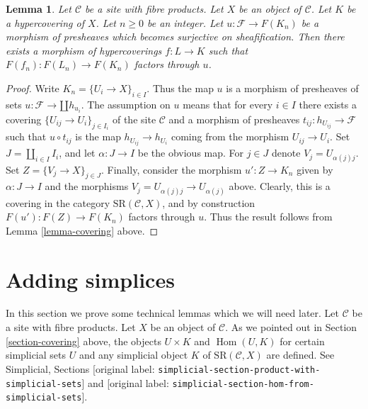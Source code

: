\documentclass[10pt,a4paper]{article}
\theoremstyle{plain}
\newtheorem{lemma}[subsection]{Lemma}
\theoremstyle{definition}
\theoremstyle{remark}
\numberwithin{equation}{subsection}
\def\Hom{\mathop{\mathrm{Hom}}\nolimits}
\begin{document}
\begin{lemma}
\label{lemma-covering-sheaf}
Let $\mathcal{C}$ be a site with fibre products.
Let $X$ be an object of $\mathcal{C}$.
Let $K$ be a hypercovering of $X$.
Let $n \geq 0$ be an integer.
Let $u : \mathcal{F} \to F(K_n)$ be a morphism
of presheaves which becomes surjective
on sheafification.
Then there exists a morphism of hypercoverings
$f: L \to K$ such that $F(f_n) : F(L_n) \to F(K_n)$
factors through $u$.
\end{lemma}

\begin{proof}
Write $K_n = \{U_i \to X\}_{i \in I}$.
Thus the map $u$ is a morphism of presheaves of sets
$u : \mathcal{F} \to \amalg h_{u_i}$.
The assumption on $u$ means that for every
$i \in I$ there exists a covering $\{U_{ij} \to U_i\}_{j \in I_i}$
of the site $\mathcal{C}$ and a morphism of presheaves
$t_{ij} : h_{U_{ij}} \to \mathcal{F}$ such that
$u \circ t_{ij}$ is the map $h_{U_{ij}} \to h_{U_i}$
coming from the morphism $U_{ij} \to U_i$.
Set $J = \amalg_{i \in I} I_i$, and let
$\alpha : J \to I$ be the obvious map.
For $j \in J$ denote $V_j = U_{\alpha(j)j}$. Set
$Z = \{V_j \to X\}_{j \in J}$.
Finally, consider the morphism
$u' : Z \to K_n$ given by $\alpha : J \to I$
and the morphisms $V_j = U_{\alpha(j)j} \to U_{\alpha(j)}$
above. Clearly, this is a covering in the
category $\text{SR}(\mathcal{C}, X)$, and by
construction $F(u') : F(Z) \to F(K_n)$ factors through $u$.
Thus the result follows from Lemma \ref{lemma-covering} above.
\end{proof}


\section{Adding simplices}
\label{section-adding-simplices}

\noindent
In this section we prove some technical lemmas which we will need later.
Let $\mathcal{C}$ be a site with fibre products.
Let $X$ be an object of $\mathcal{C}$.
As we pointed out in Section \ref{section-covering} above,
the objects $U \times K$ and $\Hom(U, K)$
for certain simplicial sets $U$
and any simplicial object $K$ of $\text{SR}(\mathcal{C}, X)$
are defined. See Simplicial, Sections
\textnormal{[original label: \nolinkurl{simplicial-section-product-with-simplicial-sets}]} and
\textnormal{[original label: \nolinkurl{simplicial-section-hom-from-simplicial-sets}]}.
\end{document}
